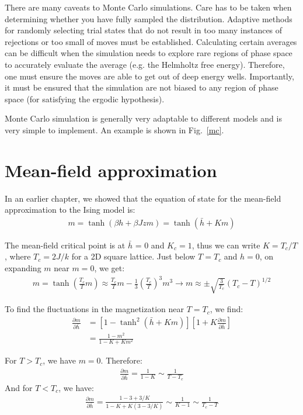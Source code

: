 \documentclass[book.tex]{subfiles}
\begin{document}
There are many caveats to Monte Carlo simulations. Care has to be taken when determining whether you have fully sampled the distribution. Adaptive methods for randomly selecting trial states that do not result in too many instances of rejections or too small of moves must be established. Calculating certain averages can be difficult when the simulation needs to explore rare regions of phase space to accurately evaluate the average (e.g. the Helmholtz free energy). Therefore, one must ensure the moves are able to get out of deep energy wells. Importantly, it must be ensured that the simulation are not biased to any region of phase space (for satisfying the ergodic hypothesis).

Monte Carlo simulation is generally very adaptable to different models and is very simple to implement. An example is shown in Fig.~\ref{mc}.

\section{Mean-field approximation}

In an earlier chapter, we showed that the equation of state for the mean-field approximation to the Ising model is:
\begin{align}\label{Eq8}
m = \tanh(\beta h + \beta J zm) = \tanh(\bar{h} + Km) 
\end{align}

The mean-field critical point is at $\bar{h}$ = 0 and $K_c = 1$, thus we can write $K = T_c/T$, where $T_c = 2J/k$ for a 2D square lattice. Just below $T = T_c$ and $h = 0$, on expanding $m$ near $m=0$, we get:
\begin{align}\label{Eq9}
m = \tanh \left( \frac{T_c}{T}m \right) \approx \frac{T_c}{T}m - \frac{1}{3}\left( \frac{T_c}{T}\right)^3m^3 \rightarrow m \approx \pm \sqrt{\frac{3}{T_c}}(T_c-T)^{1/2}
\end{align}

To find the fluctuations in the magnetization near $T = T_c$, we find:
\begin{align}\label{Eq10}
\frac{\partial m}{\partial \bar{h}} &= [1 - \tanh^{2} (\bar{h} + Km)][1 + K\frac{\partial m}{\partial \bar{h}}]  \\
&=  \frac{1-m^{2}}{1-K+Km^{2}}
\end{align}

For $T > T_c$, we have $m=0$. Therefore:
\begin{align}
\frac{\partial m}{\partial \bar{h}} =  \frac{1}{1-K} \sim \frac{1}{T-T_c} 
\end{align}
And for $T < T_c$, we have:
\begin{align}
\frac{\partial m}{\partial \bar{h}} =  \frac{1-3+3/K}{1-K+K(3-3/K)}  \sim \frac{1}{K-1} \sim \frac{1}{T_c-T} 
\end{align}
\end{document}
